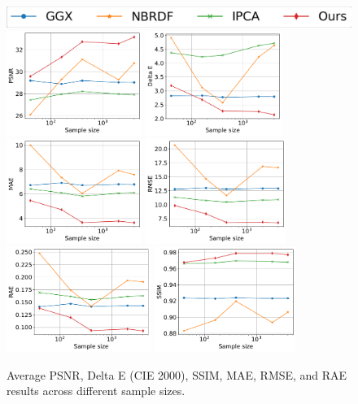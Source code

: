 \begin{figure}[t]
  \centering
    {\includegraphics[width=0.35\linewidth]{Chapters/hyperbrdf-figs/legend.png}}\\
  {\includegraphics[width=0.32\linewidth, height=3.4cm]{Chapters/hyperbrdf-figs/PSNR_ggx.pdf}}
  {\includegraphics[width=0.32\linewidth, height=3.4cm]{Chapters/hyperbrdf-figs/DeltaE_ggx.pdf}}
  {\includegraphics[width=0.32\linewidth, height=3.4cm]{Chapters/hyperbrdf-figs/MAE_ggx.pdf}}
  {\includegraphics[width=0.32\linewidth, height=3.4cm]{Chapters/hyperbrdf-figs/RMSE_ggx.pdf}}
    {\includegraphics[width=0.32\linewidth, height=3.4cm]{Chapters/hyperbrdf-figs/RAE_ggx.pdf}}
    {\includegraphics[width=0.32\linewidth, height=3.4cm]{Chapters/hyperbrdf-figs/SSIM_ggx.pdf}}
   \caption{Average \gls{PSNR}, Delta E (CIE 2000), \gls{SSIM}, MAE, RMSE, and RAE results across different sample sizes. }
   \label{fig:imp_plots}
\end{figure}



